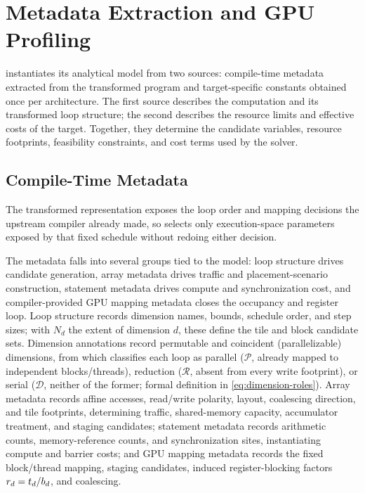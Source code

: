 \section{Metadata Extraction and GPU Profiling}
\label{sec:metadata}

\name instantiates its analytical model from two sources: compile-time metadata extracted from the transformed program and target-specific constants obtained once per \gpu architecture. The first source describes the computation and its transformed loop structure; the second describes the resource limits and effective costs of the target. Together, they determine the candidate variables, resource footprints, feasibility constraints, and cost terms used by the solver.

\subsection{Compile-Time Metadata}
\label{sec:compile-time-metadata}

The transformed representation exposes the loop order and mapping decisions the upstream compiler already made, so \name selects only execution-space parameters exposed by that fixed schedule without redoing either decision.

The metadata falls into several groups tied to the model: loop structure drives candidate generation, array metadata drives traffic and placement-scenario construction, statement metadata drives compute and synchronization cost, and compiler-provided GPU mapping metadata closes the occupancy and register loop. Loop structure records dimension names, bounds, schedule order, and step sizes; with \(N_d\) the extent of dimension \(d\), these define the tile and block candidate sets. Dimension annotations record permutable and coincident (parallelizable) dimensions, from which \name classifies each loop as parallel (\(\mathcal{P}\), already mapped to independent blocks/threads), reduction (\(\mathcal{R}\), absent from every write footprint), or serial (\(\mathcal{D}\), neither of the former; formal definition in \autoref{eq:dimension-roles}). Array metadata records affine accesses, read/write polarity, layout, coalescing direction, and tile footprints, determining traffic, shared-memory capacity, accumulator treatment, and staging candidates; statement metadata records arithmetic counts, memory-reference counts, and synchronization sites, instantiating compute and barrier costs; and GPU mapping metadata records the fixed block/thread mapping, staging candidates, induced register-blocking factors \(r_d=t_d/b_d\), and coalescing.

